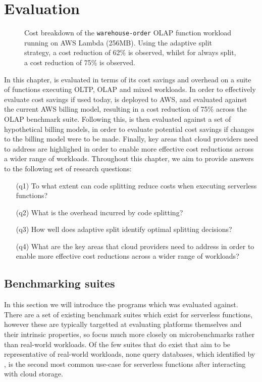 \chapter{Evaluation}
\label{sec:evaluation}
\begin{figure}
    \begin{center}
        
    \end{center}
    \caption{Cost breakdown of the \texttt{warehouse-order} OLAP function workload running on AWS Lambda (256MB). Using the adaptive split strategy, a cost reduction of 62\% is observed, whilst for always split, a cost reduction of 75\% is observed.}
\end{figure}

In this chapter, \faaas{} is evaluated in terms of its cost savings and overhead on a suite of \faas{} functions executing OLTP, OLAP and mixed workloads. In order to effectively evaluate cost savings if used today, \faas{} is deployed to AWS, and evaluated against the current AWS billing model, resulting in a cost reduction of 75\% across the OLAP benchmark suite. Following this, \faaas{} is then evaluated against a set of hypothetical billing models, in order to evaluate potential cost savings if changes to the billing model were to be made. Finally, key areas that cloud providers need to address are highlighed in order to enable more effective cost reductions across a wider range of \faas{} workloads. Throughout this chapter, we aim to provide answers to the following set of research questions:

\begin{itemize}
    \item[(q1)] To what extent can code splitting reduce costs when executing serverless functions?
    \item[(q2)] What is the overhead incurred by code splitting?
    \item[(q3)] How well does adaptive split identify optimal splitting decisions?
    \item[(q4)] What are the key areas that cloud providers need to address in order to enable more effective cost reductions across a wider range of \faas{} workloads?
\end{itemize}

\section{Benchmarking suites}
In this section we will introduce the programs which \faaas{} was evaluated against. There are a set of existing benchmark suites which exist for serverless functions, however these are typically targetted at evaluating \faas{} platforms themselves and their intrinsic properties, so focus much more closely on microbenchmarks rather than real-world workloads. Of the few suites that do exist that aim to be representative of real-world workloads, none query databases, which identified by \cite{eismannReviewServerlessUse2020}, is the second most common use-case for serverless functions after interacting with cloud storage.

